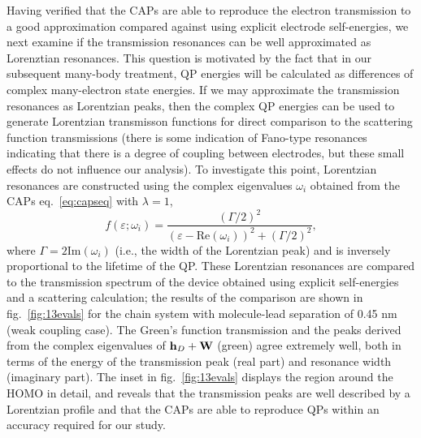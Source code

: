 Having verified that the \acp{CAP} are able to reproduce the electron
transmission to a good approximation compared against using explicit
electrode self-energies, we next examine if the transmission resonances
can be well approximated as Lorenztian resonances. This question is
motivated by the fact that in our subsequent many-body treatment,
\ac{QP} energies will be calculated as differences of complex
many-electron state energies. If we may approximate the transmission
resonances as Lorentzian peaks, then the complex \ac{QP} energies 
can be used to generate Lorentzian transmisson functions for direct
comparison to the scattering function transmissions (there is some
indication of Fano-type resonances indicating that there is a degree of
coupling between electrodes, but these small effects do not influence
our analysis). To investigate this point, Lorentzian  resonances are
constructed using the complex eigenvalues $\omega_i$ obtained from the 
\acp{CAP} eq.~\ref{eq:capseq} with $\lambda=1$, 
\begin{equation}
        f(\varepsilon;\omega_i)
        = \frac{\left( \Gamma/2 \right)^2}
               {(\varepsilon - \mathrm{Re}(\omega_i))^2
               + \left( \Gamma/2 \right)^2},
        \label{eq:lobro}
\end{equation}
where $\Gamma = 2 \mathrm{Im}(\omega_i)$ (i.e., the width of the
Lorentzian peak) and is inversely proportional to the lifetime of the
\ac{QP}. These Lorentzian resonances are compared to the transmission
spectrum of the device obtained using explicit self-energies and a
scattering calculation; the results of the comparison are shown in
fig.~\ref{fig:13evals} for the chain system with molecule-lead separation
of 0.45 nm (weak coupling case). The Green's function transmission and
the peaks derived from the complex eigenvalues of $\mathbf{h}_D + \mathbf{W}$
(green) agree extremely well, both in terms of the energy of the transmission
peak (real part) and resonance width (imaginary part).  The inset in
fig.~\ref{fig:13evals} displays the region around the \ac{HOMO} in
detail, and reveals that the transmission peaks are well described by a
Lorentzian profile and that the CAPs are able to reproduce \acp{QP}
within an accuracy required for our study.

